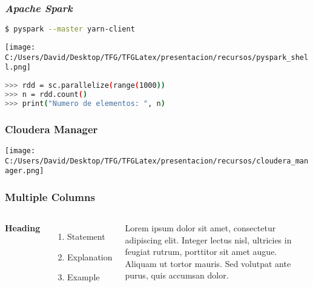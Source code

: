\documentclass{beamer}
\begin{document}
\begin{frame}[fragile]
\frametitle{\textit{Apache Spark}}

\begin{lstlisting}[language=bash, numbers=none, frame=single]
$ pyspark --master yarn-client
\end{lstlisting}

\texttt{[image: C:/Users/David/Desktop/TFG/TFGLatex/presentacion/recursos/pyspark\_shell.png]}

\begin{lstlisting}[language=bash, numbers=none, frame=single, showstringspaces=false]
>>> rdd = sc.parallelize(range(1000))
>>> n = rdd.count()
>>> print("Numero de elementos: ", n)
\end{lstlisting}

\end{frame}


\begin{frame}
  \frametitle{Cloudera Manager}
  \texttt{[image: C:/Users/David/Desktop/TFG/TFGLatex/presentacion/recursos/cloudera\_manager.png]}
\end{frame}


\begin{frame}
\frametitle{Multiple Columns}
\begin{columns}[c] %

\textbf{Heading}
\begin{enumerate}
\item Statement
\item Explanation
\item Example
\end{enumerate}

Lorem ipsum dolor sit amet, consectetur adipiscing elit. Integer lectus nisl, ultricies in feugiat rutrum, porttitor sit amet augue. Aliquam ut tortor mauris. Sed volutpat ante purus, quis accumsan dolor.

\end{columns}
\end{frame}
\end{document}

